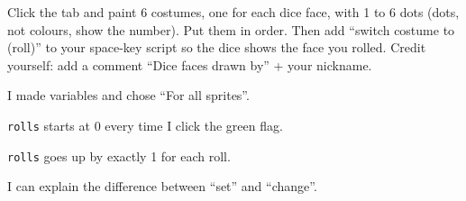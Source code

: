 \begin{creative}
Click the  tab and paint 6 costumes, one for each dice face, with 1 to 6 dots (dots, not colours, show the number). Put them in order. Then add \enquote{switch costume to (roll)} to your space-key script so the dice shows the face you rolled. Credit yourself: add a comment \enquote{Dice faces drawn by} + your nickname.
\end{creative}

\begin{selfcheck}
  \item I made variables and chose \enquote{For all sprites}.
  \item \texttt{rolls} starts at 0 every time I click the green flag.
  \item \texttt{rolls} goes up by exactly 1 for each roll.
  \item I can explain the difference between \enquote{set} and \enquote{change}.
\end{selfcheck}
